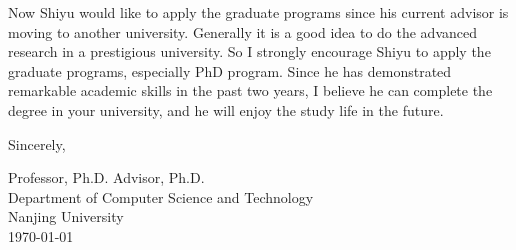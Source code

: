 \documentclass{letter}
\begin{document}
Now Shiyu would like to apply the graduate programs since his current advisor is moving to another university. Generally it is a good idea to do the advanced research in a prestigious university. So I strongly encourage Shiyu to apply the graduate programs, especially PhD program. Since he has demonstrated remarkable academic skills in the past two years, I believe he can complete the degree in your university, and he will enjoy the study life in the future.

Sincerely,

\vspace{1cm}

Professor, Ph.D. Advisor, Ph.D.\\
Department of Computer Science and Technology\\
Nanjing University\\
\today{}
\end{document}
